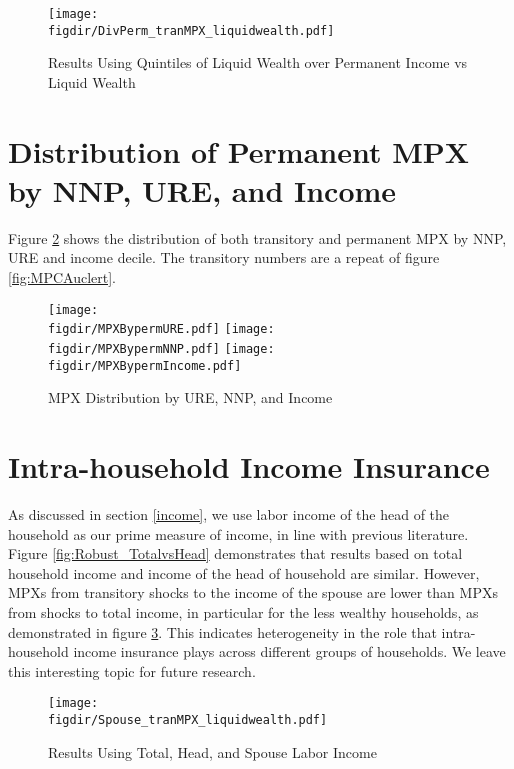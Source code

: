 \documentclass[titlepage]{\econtex}\newcommand{\texname}{ConsumptionHeterogeneity}
\newcommand{\figdir}{../Code/Rcode/Figures/AEJ_revision}
\begin{document}
	\begin{figure} 
		\begin{centering}
			\texttt{[image: \\figdir/DivPerm\_tranMPX\_liquidwealth.pdf]}
			\caption{Results Using Quintiles of Liquid Wealth over Permanent Income vs Liquid Wealth}
			\label{fig:Robust_DivPerm}
		\end{centering}
	\end{figure}
	
	
	\section{Distribution of Permanent MPX by NNP, URE, and Income} \label{PermMPXbyURENNP}
	\setcounter{figure}{0}   
	\setcounter{table}{0} 
	Figure \ref{fig:MPCAuclert_perm} shows the distribution of both transitory and permanent MPX by NNP, URE and income decile. The transitory numbers are a repeat of figure \ref{fig:MPCAuclert}.
	\begin{figure} 
		\begin{centering}
			\texttt{[image: \\figdir/MPXBypermURE.pdf]}
			\texttt{[image: \\figdir/MPXBypermNNP.pdf]}
			\texttt{[image: \\figdir/MPXBypermIncome.pdf]}
			\caption{MPX Distribution by URE, NNP, and Income}
			\label{fig:MPCAuclert_perm}
		\end{centering}
	\end{figure}
	
	\section{Intra-household Income Insurance} \label{Insurance}
	\setcounter{figure}{0}   
	\setcounter{table}{0} 
	As discussed in section \ref{income}, we use labor income of the head of the household as our prime measure of income, in line with previous literature. Figure \ref{fig:Robust_TotalvsHead} demonstrates that results based on total household income and income of the head of household are similar. However, MPXs from transitory shocks to the income of the spouse are lower than MPXs from shocks to total income, in particular for the less wealthy households, as demonstrated in figure \ref{fig:Robust_Spouse}. This indicates heterogeneity in the role that intra-household income insurance plays across different groups of households. We leave this interesting topic for future research. 
	
	
	\begin{figure} 
		\begin{centering}
			\texttt{[image: \\figdir/Spouse\_tranMPX\_liquidwealth.pdf]}
			\caption{Results Using Total, Head, and Spouse Labor Income}
			\label{fig:Robust_Spouse}
		\end{centering}
	\end{figure}
	
	
	
	
	\small
	\normalsize
	
\end{document}
